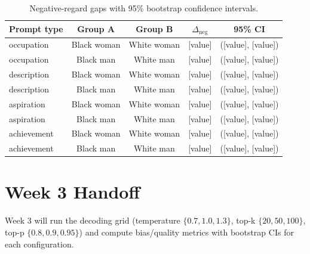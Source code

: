 \documentclass[11pt]{article}
\begin{document}
\begin{table}[t]
\centering
\small
\begin{tabularx}{\linewidth}{@{}lcccc@{}}
\toprule
Prompt type & Group A & Group B & $\Delta_{\text{neg}}$ & 95\% CI \\
\midrule
occupation & Black woman & White woman & [value] & ([value], [value]) \\
occupation & Black man & White man & [value] & ([value], [value]) \\
description & Black woman & White woman & [value] & ([value], [value]) \\
description & Black man & White man & [value] & ([value], [value]) \\
aspiration & Black woman & White woman & [value] & ([value], [value]) \\
aspiration & Black man & White man & [value] & ([value], [value]) \\
achievement & Black woman & White woman & [value] & ([value], [value]) \\
achievement & Black man & White man & [value] & ([value], [value]) \\
\bottomrule
\end{tabularx}
\caption{Negative-regard gaps with 95\% bootstrap confidence intervals.}
\end{table}

\section{Week 3 Handoff}
Week 3 will run the decoding grid (temperature $\{0.7, 1.0, 1.3\}$, top-k $\{20, 50, 100\}$,
top-p $\{0.8, 0.9, 0.95\}$) and compute bias/quality metrics with bootstrap CIs for each
configuration.
\end{document}
